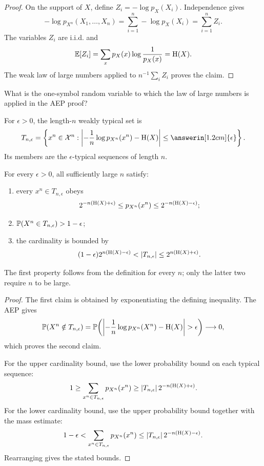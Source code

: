 \begin{proof}
On the support of $X$, define $Z_i=-\log p_X(X_i)$. Independence gives
\[
  -\log p_{X^n}(X_1,\ldots,X_n)
  =\sum_{i=1}^n-\log p_X(X_i)=\sum_{i=1}^n Z_i.
\]
The variables $Z_i$ are i.i.d. and
\[
  \mathbb{E}[Z_i]=\sum_xp_X(x)\log\frac1{p_X(x)}=\mathrm{H}(X).
\]
The weak law of large numbers applied to $n^{-1}\sum_iZ_i$ proves the claim.
\end{proof}

\begin{yourturn}
What is the one-symbol random variable to which the law of large numbers is
applied in the AEP proof?
\ifshowanswers\else\workspace[1]\fi
{}
\end{yourturn}


\begin{definition}\label{def:weak-typical-set}
For $\epsilon>0$, the length-$n$ weakly typical set is
\[
  T_{n,\epsilon}
  =\left\{x^n\in\X^n:
  \left|-\frac1n\log p_{X^n}(x^n)-\Ent(X)\right|
  \le \answerin[1.2cm]{\epsilon}\right\}.
\]
Its members are the $\epsilon$-typical sequences of length $n$.
\end{definition}

\begin{theorem}\label{thm:typical-set-properties}
For every $\epsilon>0$, all sufficiently large $n$ satisfy:
\begin{enumerate}
  \item every $x^n\in T_{n,\epsilon}$ obeys
  \[
    2^{-n(\mathrm{H}(X)+\epsilon)}
    \le p_{X^n}(x^n)
    \le 2^{-n(\mathrm{H}(X)-\epsilon)};
  \]
  \item $\mathbb{P}(X^n\in T_{n,\epsilon})>1-\epsilon$;
  \item the cardinality is bounded by
  \[
    (1-\epsilon)2^{n(\Ent(X)-\epsilon)}
    <|T_{n,\epsilon}|
    \le2^{n(\Ent(X)+\epsilon)}.
  \]
\end{enumerate}
The first property follows from the definition for every $n$; only the latter
two require $n$ to be large.
\end{theorem}

\begin{proof}
The first claim is obtained by exponentiating the defining inequality. The AEP
gives
\[
  \PP(X^n\notin T_{n,\epsilon})
  =\PP\!\left(\left|-\frac1n\log p_{X^n}(X^n)-\Ent(X)\right|>\epsilon\right)
  \longrightarrow0,
\]
which proves the second claim.

For the upper cardinality bound, use the lower probability bound on each typical
sequence:
\[
  1\ge\sum_{x^n\in T_{n,\epsilon}}p_{X^n}(x^n)
  \ge |T_{n,\epsilon}|\,2^{-n(\mathrm{H}(X)+\epsilon)}.
\]
For the lower cardinality bound, use the upper probability bound together with
the mass estimate:
\[
  1-\epsilon
  <\sum_{x^n\in T_{n,\epsilon}}p_{X^n}(x^n)
  \le |T_{n,\epsilon}|\,2^{-n(\mathrm{H}(X)-\epsilon)}.
\]
Rearranging gives the stated bounds.
\end{proof}

